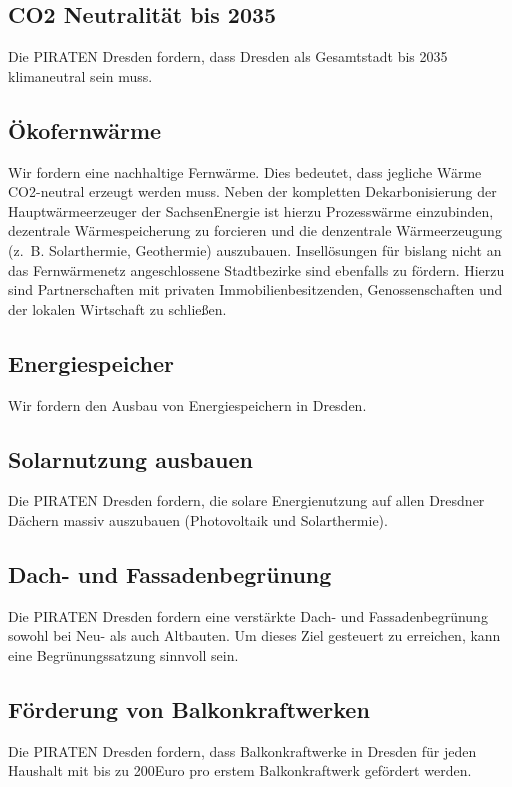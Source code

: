 \documentclass[a4paper, 11pt]{article}
\begin{document}
\subsection{CO2 Neutralität bis 2035}
Die PIRATEN Dresden fordern, dass Dresden als Gesamtstadt bis 2035 klimaneutral sein muss.


\subsection{Ökofernwärme}
Wir fordern eine nachhaltige Fernwärme. Dies bedeutet, dass jegliche Wärme CO2-neutral erzeugt werden muss. Neben der kompletten Dekarbonisierung der Hauptwärmeerzeuger der SachsenEnergie ist hierzu Prozesswärme einzubinden, dezentrale Wärmespeicherung zu forcieren und die denzentrale Wärmeerzeugung (z. B. Solarthermie, Geothermie) auszubauen. Insellösungen für bislang nicht an das Fernwärmenetz angeschlossene Stadtbezirke sind ebenfalls zu fördern. Hierzu sind Partnerschaften mit privaten Immobilienbesitzenden, Genossenschaften und der lokalen Wirtschaft zu schließen.



\subsection{Energiespeicher}
Wir fordern den Ausbau von Energiespeichern in Dresden.


\subsection{Solarnutzung ausbauen}
Die PIRATEN Dresden fordern, die solare Energienutzung auf allen Dresdner Dächern massiv auszubauen (Photovoltaik und Solarthermie).


\subsection{Dach- und Fassadenbegrünung}
Die PIRATEN Dresden fordern eine verstärkte Dach- und Fassadenbegrünung sowohl bei Neu- als auch Altbauten. Um dieses Ziel gesteuert zu erreichen, kann eine Begrünungssatzung sinnvoll sein.


\subsection{Förderung von Balkonkraftwerken}
Die PIRATEN Dresden fordern, dass Balkonkraftwerke in Dresden für jeden Haushalt mit bis zu 200Euro pro erstem Balkonkraftwerk gefördert werden.
\end{document}
